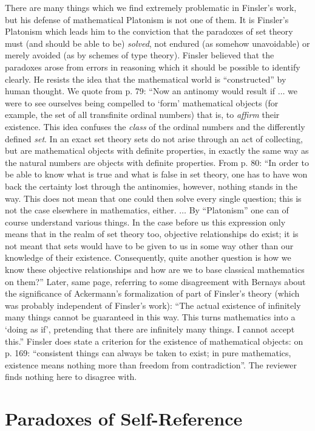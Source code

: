There are many things which we find extremely problematic in Finsler's
work, but his defense of mathematical Platonism is not one of them.
It is Finsler's Platonism which leads him to the conviction that the
paradoxes of set theory must (and should be able to be) {\em
solved\/}, not endured (as somehow unavoidable) or merely avoided (as
by schemes of type theory).  Finsler believed that the paradoxes arose
from errors in reasoning which it should be possible to identify
clearly.  He resists the idea that the mathematical world is
``constructed'' by human thought.  We quote from p. 79: ``Now an
antinomy would result if $\ldots$ we were to see ourselves being
compelled to `form' mathematical objects (for example, the set of all
transfinite ordinal numbers) that is, to {\em affirm\/} their
existence.  This idea confuses the {\em class\/} of the ordinal
numbers and the differently defined {\em set\/}.  In an exact set
theory sets do not arise through an act of collecting, but are
mathematical objects with definite properties, in exactly the same way
as the natural numbers are objects with definite properties.  From
p. 80: ``In order to be able to know what is true and what is false in
set theory, one has to have won back the certainty lost through the
antinomies, however, nothing stands in the way.  This does not mean
that one could then solve every single question; this is not the case
elsewhere in mathematics, either. $\ldots$ By ``Platonism'' one can of
course understand various things.  In the case before us this
expression only means that in the realm of set theory too, objective
relationships do exist; it is not meant that sets would have to be
given to us in some way other than our knowledge of their existence.
Consequently, quite another question is how we know these objective
relationships and how are we to base classical mathematics on them?''
Later, same page, referring to some disagreement with Bernays about
the significance of Ackermann's formalization of part of Finsler's
theory (which was probably independent of Finsler's work): ``The
actual existence of infinitely many things cannot be guaranteed in
this way.  This turns mathematics into a `doing as if', pretending
that there are infinitely many things.  I cannot accept this.''
Finsler does state a criterion for the existence of mathematical
objects: on p. 169: ``consistent things can always be taken to exist;
in pure mathematics, existence means nothing more than freedom from
contradiction''.  The reviewer finds nothing here to disagree with.

\section{Paradoxes of Self-Reference}

